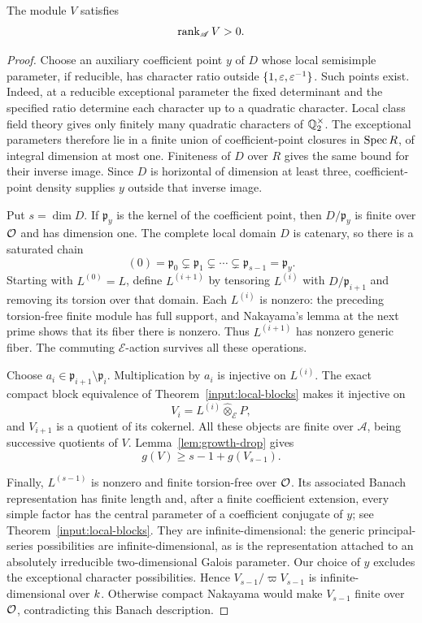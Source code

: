 \begin{proposition}\label{prop:positive-rank}
The module $V$ satisfies
\[
                       \operatorname{rank}_{\mathscr A}V>0.
\]
\end{proposition}
\begin{proof}
Choose an auxiliary coefficient point $y$ of $D$ whose local
semisimple parameter, if reducible, has character ratio outside
$\{1,\varepsilon,\varepsilon^{-1}\}$.  Such points exist.  Indeed, at a reducible
exceptional parameter the fixed determinant and the specified ratio
determine each character up to a quadratic character.  Local class
field theory gives only finitely many quadratic characters of
$\mathbb Q_2^\times$.  The exceptional parameters therefore lie in a finite
union of coefficient-point closures in $\operatorname{Spec} R$, of integral
dimension at most one.  Finiteness of $D$ over $R$ gives the same
bound for their inverse image.  Since $D$ is horizontal of dimension
at least three, coefficient-point density
\cite[Lemma~3.3]{FM2} supplies $y$ outside that inverse image.

Put $s=\dim D$.  If $\mathfrak p_y$ is the kernel of the coefficient
point, then $D/\mathfrak p_y$ is finite over $\mathcal O$ and has dimension
one.  The complete local domain $D$ is catenary, so there is a
saturated chain
\[
 (0)=\mathfrak p_0\subsetneq\mathfrak p_1
       \subsetneq\cdots\subsetneq\mathfrak p_{s-1}=\mathfrak p_y.
\]
Starting with $L^{(0)}=L$, define $L^{(i+1)}$ by tensoring $L^{(i)}$ with
$D/\mathfrak p_{i+1}$ and removing its torsion over that domain.
Each $L^{(i)}$ is nonzero: the preceding torsion-free finite module has
full support, and Nakayama's lemma at the next prime shows that its
fiber there is nonzero.  Thus $L^{(i+1)}$ has nonzero generic fiber.
The commuting $\mathcal E$-action survives all these operations.

Choose $a_i\in\mathfrak p_{i+1}\setminus\mathfrak p_i$.
Multiplication by $a_i$ is injective on $L^{(i)}$.  The exact compact
block equivalence of Theorem~\ref{input:local-blocks} makes it injective
on
\[
                  V_i=L^{(i)}\widehat\otimes_{\mathcal E}P,
\]
and $V_{i+1}$ is a quotient of its cokernel.  All these objects are
finite over $\mathscr A$, being successive quotients of $V$.
Lemma~\ref{lem:growth-drop} gives
\begin{equation}\label{eq:chain-growth}
             g(V)\geq s-1+g(V_{s-1}).
\end{equation}

Finally, $L^{(s-1)}$ is nonzero and finite torsion-free over $\mathcal O$.
Its associated Banach representation has finite length and, after
a finite coefficient extension, every simple factor has the
central parameter of a coefficient conjugate of $y$; see
Theorem~\ref{input:local-blocks}.
They are infinite-dimensional: the generic principal-series
possibilities are infinite-dimensional, as is the representation
attached to an absolutely irreducible two-dimensional Galois
parameter.  Our choice of $y$ excludes the exceptional character
possibilities.  Hence $V_{s-1}/\varpi V_{s-1}$ is infinite-dimensional
over $k$.  Otherwise compact Nakayama would make $V_{s-1}$ finite
over $\mathcal O$, contradicting this Banach description.


\end{proof}
